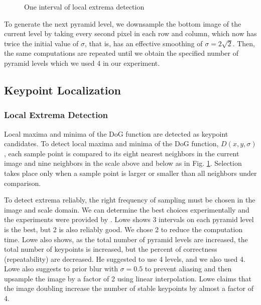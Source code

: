 \documentclass{article}
\begin{document}
\begin{figure}[ht]
  \begin{center}
  \end{center}
  \caption{One interval of local extrema detection}
  \label{Fi:EXT}
\end{figure}

To generate the next pyramid level, we downsample the bottom image of the current level by taking every second pixel in each row and column, which now has twice the initial value of $ \sigma $, that is, has an effective smoothing of $ \sigma = 2 \sqrt{2} $. 
Then, the same computations are repeated until we obtain the specified number of pyramid levels which we used 4 in our experiment. 

\subsection{Keypoint Localization}

\subsubsection{Local Extrema Detection}\label{SSS:LED}
Local maxima and minima of the DoG function are detected as keypoint candidates. 
To detect local maxima and minima of the DoG function, $D(x,y,\sigma)$, each sample point is compared to its eight nearest neighbors in the current image and nine neighbors in the scale above and below as in Fig. \ref{Fi:EXT}. 
Selection takes place only when a sample point is larger or smaller than all neighbors under comparison. 

To detect extrema reliably, the right frequency of sampling must be chosen in the image and scale domain. 
We can determine the best choices experimentally and the experiments were provided by \cite{dLowe04}. 
Lowe shows 3 intervals on each pyramid level is the best, but 2 is also reliably good. We chose 2 to reduce the computation time. 
Lowe also shows, as the total number of pyramid levels are increased, the total number of keypoints is increased, but the percent of correctness (repeatability) are decreased. 
He suggested to use 4 levels, and we also used 4. 
Lowe also suggests to prior blur with $ \sigma = 0.5 $ to prevent aliasing
and then upsample the image by a factor of 2 using linear interpolation. 
Lowe claims that the image doubling increase the number of stable keypoints by almost a factor of 4.
\end{document}
